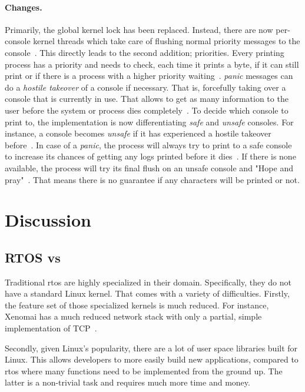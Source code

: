 \documentclass[10pt,twocolumn,a4paper]{article}
\begin{document}
\paragraph{Changes.}
Primarily, the global kernel lock has been replaced.
Instead, there are now per-console kernel threads which take care of flushing normal priority messages to the console~\cite{gleixner_printk_2024}.
This directly leads to the second addition; priorities.
Every printing process has a priority and needs to check, each time it prints a byte, if it can still print or if there is a process with a higher priority waiting~\cite{edge_discussion_2022}.
\emph{panic} messages can do a \emph{hostile takeover} of a console if necessary.
That is, forcefully taking over a console that is currently in use.
That allows to get as many information to the user before the system or process dies completely~\cite{edge_discussion_2022}.
To decide which console to print to, the  implementation is now differentiating \emph{safe} and \emph{unsafe} consoles.
For instance, a console becomes \emph{unsafe} if it has experienced a hostile takeover before~\cite{kernel_development_community_console}.
In case of a \emph{panic}, the process will always try to print to a safe console to increase its chances of getting any logs printed before it dies~\cite{gleixner_printk_2024}.
If there is none available, the process will try its final flush on an unsafe console and "Hope and pray"~\cite{kernel_development_community_console}.
That means there is no guarantee if any characters will be printed or not.

\section{Discussion}
\subsection{RTOS vs }
Traditional \acrshort{rtos} are highly specialized in their domain.
Specifically, they do not have a standard Linux kernel.
That comes with a variety of difficulties.
Firstly, the feature set of those specialized kernels is much reduced.
For instance, Xenomai has a much reduced network stack with only a partial, simple implementation of TCP~\cite{xenomai_network_2024}.

Secondly, given Linux's popularity, there are a lot of user space libraries built for Linux.
This allows developers to more easily build new applications, compared to \acrshort{rtos} where many functions need to be implemented from the ground up.
The latter is a non-trivial task and requires much more time and money.
\end{document}
